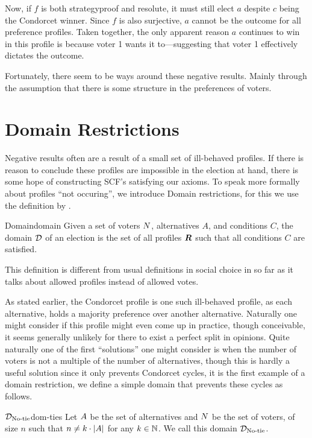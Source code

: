 Now, if $f$ is both strategyproof and resolute, it must still elect $a$ despite
$c$ being the Condorcet winner. Since $f$ is also surjective, $a$ cannot be the
outcome for all preference profiles. Taken together, the only apparent reason
$a$ continues to win in this profile is because voter 1 wants it to—suggesting
that voter 1 effectively dictates the outcome.

Fortunately, there seem to be ways around these negative results. Mainly
through the assumption that there is some structure in the preferences of
voters.

\section{Domain Restrictions} \label{sec:Domain-res}

Negative results often are a result of a small set of ill-behaved profiles. If there is
reason to conclude these profiles are impossible in the election at hand, there
is some hope of constructing SCF's satisfying our axioms. To speak more
formally about profiles ``not occuring'', we introduce Domain restrictions, for
this we use the definition by
\citet{elkindPreferenceRestrictionsComputational2022}.

\begin{definition}{Domain}{domain}
	{
		Given a set of voters $N$, alternatives $A$, and conditions $C$, the domain $\mathcal{D}_{\textnormal{}}$ of an election is the set of all profiles $\boldsymbol{R}$ such that all conditions $C$ are satisfied.
	}
\end{definition}

This definition is different from usual definitions in social choice in so far as it talks about allowed profiles instead of allowed votes.

As stated earlier, the Condorcet profile is one such ill-behaved profile, as
each alternative, holds a majority preference over another alternative.
Naturally one might consider if this profile might even come up in practice,
though conceivable, it seems generally unlikely for there to exist a perfect
split in opinions. Quite naturally one of the first ``solutions'' one might
consider is when the number of voters is not a multiple of the number of
alternatives, though this is hardly a useful solution since it only prevents
Condorcet cycles, it is the first example of a domain restriction, we define a
simple domain that prevents these cycles as follows.

\begin{definition}{$\mathcal{D}_{\textnormal{No-tie}}$}{dom-ties}
	Let $A$ be the set of alternatives and $N$ be the set of voters, of size $n$ such that $n \neq k \cdot |A|$ for any $k \in \mathbb{N}$. We call this domain $\mathcal{D}_{\textnormal{No-tie}}$.
\end{definition}

